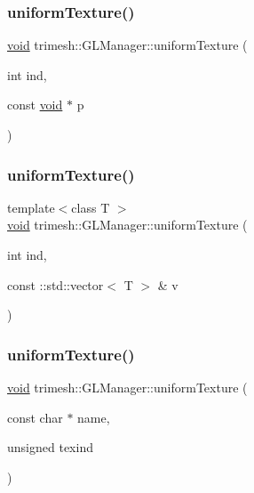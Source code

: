 \subsubsection{\texorpdfstring{uniform\+Texture()}{uniformTexture()}\hspace{0.1cm}{\footnotesize\ttfamily [2/6]}}
{\footnotesize\ttfamily \hyperlink{namespacetrimesh_a784ddfd979e1c579bda795a8edfc3f43}{void} trimesh\+::\+G\+L\+Manager\+::uniform\+Texture (\begin{DoxyParamCaption}\item[{int}]{ind,  }\item[{const \hyperlink{namespacetrimesh_a784ddfd979e1c579bda795a8edfc3f43}{void} $\ast$}]{p }\end{DoxyParamCaption})\hspace{0.3cm}{\ttfamily [inline]}}

\mbox{\label{classtrimesh_1_1GLManager_a5e48b244698c46dbea6d05bef3fd0d65}} 
\subsubsection{\texorpdfstring{uniform\+Texture()}{uniformTexture()}\hspace{0.1cm}{\footnotesize\ttfamily [3/6]}}
{\footnotesize\ttfamily template$<$class T $>$ \\
\hyperlink{namespacetrimesh_a784ddfd979e1c579bda795a8edfc3f43}{void} trimesh\+::\+G\+L\+Manager\+::uniform\+Texture (\begin{DoxyParamCaption}\item[{int}]{ind,  }\item[{const \+::std\+::vector$<$ T $>$ \&}]{v }\end{DoxyParamCaption})\hspace{0.3cm}{\ttfamily [inline]}}

\mbox{\label{classtrimesh_1_1GLManager_a4df4439932f0fd370eb60bb2d35798fb}} 
\subsubsection{\texorpdfstring{uniform\+Texture()}{uniformTexture()}\hspace{0.1cm}{\footnotesize\ttfamily [4/6]}}
{\footnotesize\ttfamily \hyperlink{namespacetrimesh_a784ddfd979e1c579bda795a8edfc3f43}{void} trimesh\+::\+G\+L\+Manager\+::uniform\+Texture (\begin{DoxyParamCaption}\item[{const char $\ast$}]{name,  }\item[{unsigned}]{texind }\end{DoxyParamCaption})\hspace{0.3cm}{\ttfamily [inline]}}

